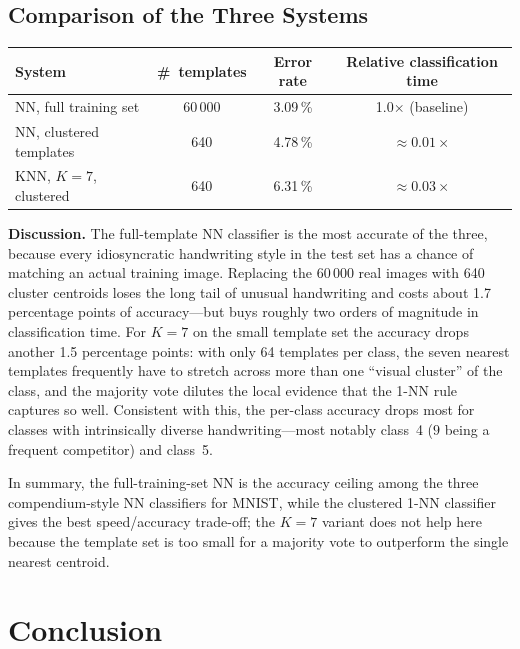 \documentclass[11pt,a4paper]{article}
\begin{document}
\subsection{Comparison of the Three Systems}

\begin{center}
\begin{tabular}{lccc}
\toprule
System & \#~templates & Error rate & Relative classification time \\
\midrule
NN, full training set   & 60\,000 & 3.09\,\% & 1.0$\times$ (baseline) \\
NN, clustered templates &    640 & 4.78\,\% & $\approx 0.01\times$ \\
KNN, $K=7$, clustered    &    640 & 6.31\,\% & $\approx 0.03\times$ \\
\bottomrule
\end{tabular}
\end{center}

\textbf{Discussion.} The full-template NN classifier is the most accurate of the three, because every idiosyncratic handwriting style in the test set has a chance of matching an actual training image. Replacing the 60\,000 real images with 640 cluster centroids loses the long tail of unusual handwriting and costs about 1.7 percentage points of accuracy---but buys roughly two orders of magnitude in classification time. For $K=7$ on the small template set the accuracy drops another 1.5 percentage points: with only 64 templates per class, the seven nearest templates frequently have to stretch across more than one ``visual cluster'' of the class, and the majority vote dilutes the local evidence that the 1-NN rule captures so well. Consistent with this, the per-class accuracy drops most for classes with intrinsically diverse handwriting---most notably class~4 ($9$ being a frequent competitor) and class~5.

In summary, the full-training-set NN is the accuracy ceiling among the three compendium-style NN classifiers for MNIST, while the clustered 1-NN classifier gives the best speed/accuracy trade-off; the $K=7$ variant does not help here because the template set is too small for a majority vote to outperform the single nearest centroid.

\section{Conclusion}
\label{sec:conclusion}
\end{document}

